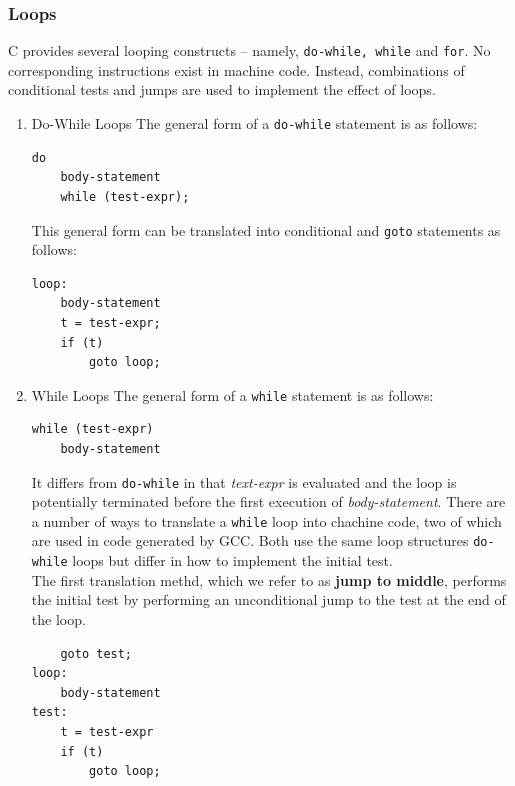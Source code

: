 \documentclass[11pt]{article}
\begin{document}
\subsubsection{Loops}
\label{sec:org873c4cf}
C provides several looping constructs -- namely, \texttt{do-while, while} and \texttt{for}. No corresponding instructions exist in machine code. Instead, combinations of conditional tests and jumps are used to implement the effect of loops.\\

\begin{enumerate}
\item Do-While Loops
\label{sec:org7368716}
The general form of a \texttt{do-while} statement is as follows:\\
\begin{verbatim}
do
    body-statement
    while (test-expr);
\end{verbatim}

This general form can be translated into conditional and \texttt{goto} statements as follows:\\
\begin{verbatim}
loop:
    body-statement
    t = test-expr;
    if (t)
        goto loop;
\end{verbatim}


\item While Loops
\label{sec:orgf5ed67e}
The general form of a \texttt{while} statement is as follows:\\
\begin{verbatim}
while (test-expr)
    body-statement
\end{verbatim}

It differs from \texttt{do-while} in that \emph{text-expr} is evaluated and the loop is potentially terminated before the first execution of \emph{body-statement}. There are a number of ways to translate a \texttt{while} loop into chachine code, two of which are used in code generated by GCC. Both use the same loop structures \texttt{do-while} loops but differ in how to implement the initial test.\\

The first translation methd, which we refer to as \textbf{jump to middle}, performs the initial test by performing an unconditional jump to the test at the end of the loop.\\
\begin{verbatim}
    goto test;
loop:
    body-statement
test:
    t = test-expr
    if (t)
        goto loop;
\end{verbatim}



\end{enumerate}
\end{document}
